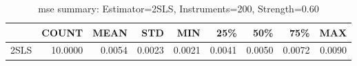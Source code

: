 \begin{table}[ht]
\centering
\caption{mse summary: Estimator=2SLS, Instruments=200, Strength=0.60}
\begin{tabular}{lrrrrrrrr}
\toprule
 & COUNT & MEAN & STD & MIN & 25\% & 50\% & 75\% & MAX \\
\midrule
2SLS & 10.0000 & 0.0054 & 0.0023 & 0.0021 & 0.0041 & 0.0050 & 0.0072 & 0.0090 \\
\bottomrule
\end{tabular}
\end{table}
